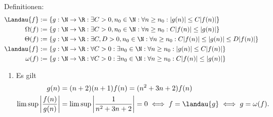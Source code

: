 \begin{solution}
Definitionen:
\begin{align*}
  \Landau{f} &:= \{g: \N \to \R: \exists C > 0, n_0 \in \N: \forall n \geq n_0:
  |g(n)| \leq C|f(n)|\} \\
  \Omega(f) &:= \{g: \N \to \R: \exists C > 0, n_0 \in \N: \forall n \geq n_0:
  C|f(n)| \leq |g(n)|\} \\
  \Theta(f) &:= \{g: \N \to \R: \exists C, D > 0, n_0 \in \N: \forall n \geq n_0:
  C|f(n)| \leq |g(n)|\leq D|f(n)|\} \\
  \landau{f} &:= \{g: \N \to \R: \forall C > 0: \exists n_0 \in \N: \forall n \geq n_0:
  |g(n)| \leq C|f(n)|\} \\
  \omega(f) &:= \{g: \N \to \R: \forall C > 0: \exists n_0 \in \N: \forall n \geq n_0:
  C|f(n)| \leq |g(n)|\}
\end{align*}
\begin{enumerate}[label = (\alph*)]
  \item Es gilt
  \begin{align*}
    g(n) &= (n + 2)(n + 1)f(n) = (n^2 + 3n + 2)f(n) \\
    \limsup \left|\frac{f(n)}{g(n)}\right| &= \limsup \left|\frac{1}{n^2 + 3n + 2}\right|
    =0 \iff f = \landau{g} \iff g = \omega(f).
  \end{align*}


\end{enumerate}
\end{solution}
